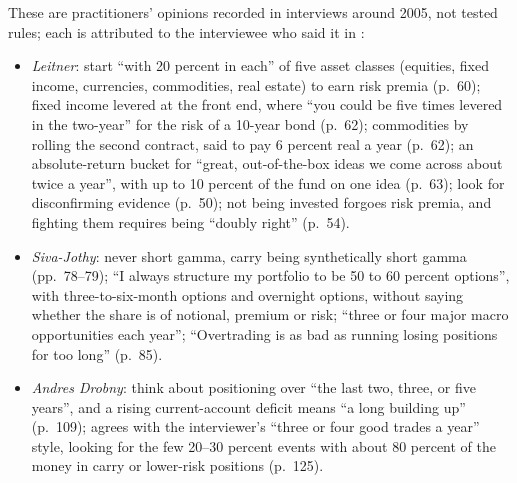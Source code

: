 \begin{qfmethod}\label{meth:macro-practitioner-frameworks}
 These are practitioners' opinions recorded in interviews around 2005, not tested rules; each is attributed to the interviewee who said it in \citep[Wiley 2006 printing, printed pages]{s7-drobny}:
\begin{itemize}
\item \emph{Leitner}: start ``with 20 percent in each'' of five asset classes (equities, fixed income, currencies, commodities, real estate) to earn risk premia (p.~60); fixed income levered at the front end, where ``you could be five times levered in the two-year'' for the risk of a 10-year bond (p.~62); commodities by rolling the second contract, said to pay 6 percent real a year (p.~62); an absolute-return bucket for ``great, out-of-the-box ideas we come across about twice a year'', with up to 10 percent of the fund on one idea (p.~63); look for disconfirming evidence (p.~50); not being invested forgoes risk premia, and fighting them requires being ``doubly right'' (p.~54).
\item \emph{Siva-Jothy}: never short gamma, carry being synthetically short gamma (pp.~78--79); ``I always structure my portfolio to be 50 to 60 percent options'', with three-to-six-month options and overnight options, without saying whether the share is of notional, premium or risk; ``three or four major macro opportunities each year''; ``Overtrading is as bad as running losing positions for too long'' (p.~85).
\item \emph{Andres Drobny}: think about positioning over ``the last two, three, or five years'', and a rising current-account deficit means ``a long building up'' (p.~109); agrees with the interviewer's ``three or four good trades a year'' style, looking for the few 20--30 percent events with about 80 percent of the money in carry or lower-risk positions (p.~125).


\end{itemize}
\end{qfmethod}
